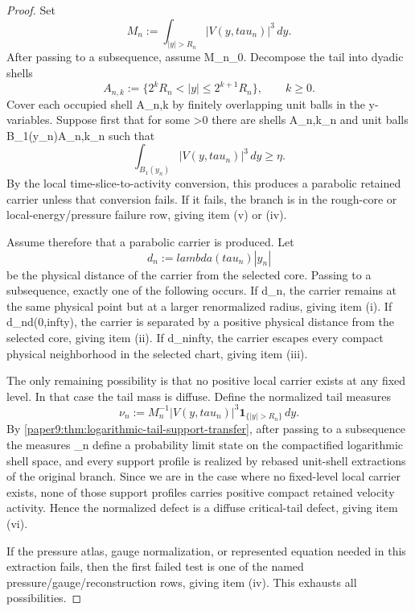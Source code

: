 \documentclass[11pt]{amsart}
\def\({}%
\def\){}%
\def\tau{tau}%
\def\lambda{lambda}%
\def\infty{infty}%
\theoremstyle{plain}
\theoremstyle{definition}
\theoremstyle{remark}
\begin{document}
\begin{proof}
Set
\[
   M_n:=\int_{|y|>R_n}|V(y,\tau_n)|^3\,dy.
\]
After passing to a subsequence, assume \(M_n\ge\varepsilon_0\).  Decompose the
tail into dyadic shells
\[
   A_{n,k}
   :=
   \{2^kR_n<|y|\le 2^{k+1}R_n\},
   \qquad k\ge0.
\]
Cover each occupied shell \(A_{n,k}\) by finitely overlapping unit balls in the
\(y\)-variables.  Suppose first that for some \(\eta>0\) there are shells
\(A_{n,k_n}\) and unit balls \(B_1(y_n)\subset A_{n,k_n}\) such that
\[
   \int_{B_1(y_n)} |V(y,\tau_n)|^3\,dy\ge \eta .
\]
By the local time-slice-to-activity conversion, this produces a parabolic
retained carrier unless that conversion fails.  If it fails, the branch is in
the rough-core or local-energy/pressure failure row, giving item
\textup{(v)} or \textup{(iv)}.

Assume therefore that a parabolic carrier is produced.  Let
\[
   d_n:=\lambda(\tau_n)|y_n|
\]
be the physical distance of the carrier from the selected core.  Passing to a
subsequence, exactly one of the following occurs.  If \(d_n\), the carrier
remains at the same physical point but at a larger renormalized radius, giving
item \textup{(i)}.  If \(d_n\to d\in(0,\infty)\), the carrier is separated by a
positive physical distance from the selected core, giving item \textup{(ii)}.
If \(d_n\to\infty\), the carrier escapes every compact physical neighborhood in
the selected chart, giving item \textup{(iii)}.

The only remaining possibility is that no positive local carrier exists at any
fixed level.  In that case the tail mass is diffuse.  Define the normalized
tail measures
\[
   \nu_n
   :=
   M_n^{-1}|V(y,\tau_n)|^3\mathbf 1_{\{|y|>R_n\}}\,dy .
\]
By \cref{paper9:thm:logarithmic-tail-support-transfer}, after passing to a
subsequence the measures \(\nu_n\) define a probability limit state on the
compactified logarithmic shell space, and every support profile is realized by
rebased unit-shell extractions of the original branch.  Since we are in the
case where no fixed-level local carrier exists, none of those support profiles
carries positive compact retained velocity activity.  Hence the normalized
defect is a diffuse critical-tail defect, giving item \textup{(vi)}.

If the pressure atlas, gauge normalization, or represented equation needed in
this extraction fails, then the first failed test is one of the named
pressure/gauge/reconstruction rows, giving item \textup{(iv)}.  This exhausts
all possibilities.
\end{proof}
\end{document}
